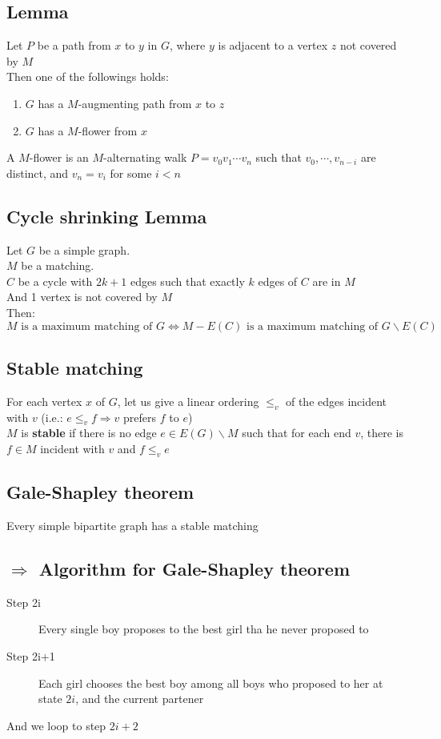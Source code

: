         \subsection{Lemma}
            Let $P$ be a path from $x$ to $y$ in $G$, where $y$ is adjacent to a vertex $z$ not covered by $M$\\
            Then one of the followings holds:\\
            \begin{enumerate}
                \item $G$ has a $M$-augmenting path from $x$ to $z$\\
                \item $G$ has a $M$-flower from $x$
            \end{enumerate}
            A $M$-flower is an $M$-alternating walk $P=v_0v_1\cdots v_n$ such that $v_0, \cdots, v_{n-i}$ are distinct, and $v_n=v_i$ for some $i<n$
        \subsection{Cycle shrinking Lemma}
            Let $G$ be a simple graph.\\
            $M$ be a matching.\\
            $C$ be a cycle with $2k+1$ edges such that exactly $k$ edges of $C$ are in $M$\\
            And 1 vertex is not covered by $M$\\
            Then: 
            \[
                M\text{ is a maximum matching of }G\Leftrightarrow M-E(C)\text{ is a maximum matching of }G\backslash E(C)
            \]
        \subsection{Stable matching}
            For each vertex $x$ of $G$, let us give a linear ordering $\leq_{v}$ of the edges incident with $v$ (i.e.: $e\leq_v f\Rightarrow v$ prefers $f$ to $e$)\\
            $M$ is \textbf{stable} if there is no edge $e\in E(G)\backslash M$ such that for each end $v$, there is $f\in M$ incident with $v$ and $f\leq_v e$
        \subsection{Gale-Shapley theorem}
            Every simple bipartite graph has a stable matching
        \subsection{$\Rightarrow$ Algorithm for Gale-Shapley theorem}
            \begin{description}
                \item[Step 2i] Every single boy proposes to the best girl tha he never proposed to
                \item[Step 2i+1] Each girl chooses the best boy among all boys who proposed to her at state $2i$, and the current partener
            \end{description}
            And we loop to step $2i+2$\\
